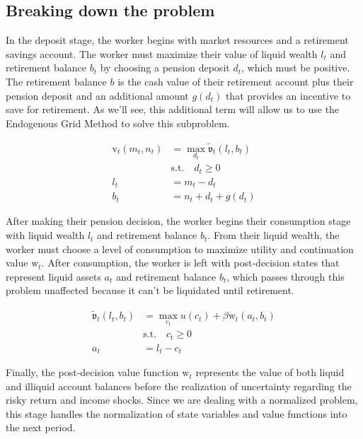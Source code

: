 \documentclass{article}
\newcommand{\DiscFac}{\beta}
\newcommand{\util}{u}
\newcommand{\bRat}{b}
\newcommand{\cRat}{c}
\newcommand{\vFunc}{\mathrm{v}}
\newcommand{\aRat}{a}
\newcommand{\mRat}{m}
\newcommand{\vOpt}{\tilde{\mathfrak{v}}}
\newcommand{\nRat}{n}
\newcommand{\dRat}{d}
\newcommand{\lRat}{l}
\newcommand{\wFunc}{\mathrm{w}}
\begin{document}
\subsection{Breaking down the problem}\label{Breaking down the problem}

In the deposit stage, the worker begins with market resources and a retirement savings account. The worker must maximize their value of liquid wealth $\lRat_{t}$ and retirement balance $\bRat_{t}$ by choosing a pension deposit $\dRat_{t}$, which must be positive. The retirement balance $\bRat$ is the cash value of their retirement account plus their pension deposit and an additional amount $g(\dRat_{t})$ that provides an incentive to save for retirement. As we'll see, this additional term will allow us to use the Endogenous Grid Method to solve this subproblem.

\begin{equation}
\begin{split}
    \vFunc_{t}(\mRat_{t}, \nRat_{t}) & = \max_{\dRat_{t}} \vOpt_{t}(\lRat_{t}, \bRat_{t}) \\
    & \text{s.t.}  \quad \dRat_{t} \ge 0 \\
    \lRat_{t} & = \mRat_{t} - \dRat_{t} \\
    \bRat_{t} & = \nRat_{t} + \dRat_{t} + g(\dRat_{t})
  \end{split}
\end{equation}

After making their pension decision, the worker begins their consumption stage with liquid wealth $\lRat_{t}$ and retirement balance $\bRat_{t}$. From their liquid wealth, the worker must choose a level of consumption to maximize utility and continuation value $\wFunc_{t}$. After consumption, the worker is left with post-decision states that represent liquid assets $\aRat_{t}$ and retirement balance $\bRat_{t}$, which passes through this problem unaffected because it can't be liquidated until retirement.

\begin{equation}
\begin{split}
    \vOpt_{t}(\lRat_{t}, \bRat_{t}) & = \max_{\cRat_{t}} \util(\cRat_{t}) + \DiscFac \wFunc_{t}(\aRat_{t}, \bRat_{t})  \\
    & \text{s.t.} \quad \cRat_{t} \ge 0 \\
    \aRat_{t} & = \lRat_{t} - \cRat_{t}
  \end{split}
\end{equation}

Finally, the post-decision value function $\wFunc_{t}$ represents the value of both liquid and illiquid account balances before the realization of uncertainty regarding the risky return and income shocks. Since we are dealing with a normalized problem, this stage handles the normalization of state variables and value functions into the next period.
\end{document}
